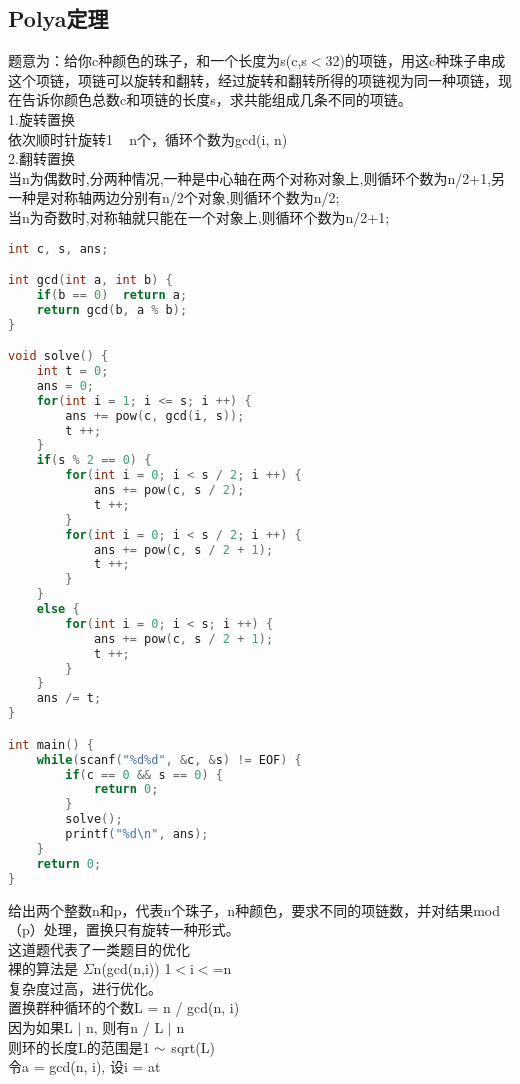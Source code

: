 \subsection{Polya定理}
题意为：给你c种颜色的珠子，和一个长度为s(c,s$<$32)的项链，用这c种珠子串成这个项链，项链可以旋转和翻转，经过旋转和翻转所得的项链视为同一种项链，现在告诉你颜色总数c和项链的长度s，求共能组成几条不同的项链。\\
1.旋转置换\\
    依次顺时针旋转1 ~ n个，循环个数为gcd(i, n)\\
2.翻转置换\\
    当n为偶数时,分两种情况,一种是中心轴在两个对称对象上,则循环个数为n/2+1,另一种是对称轴两边分别有n/2个对象,则循环个数为n/2;\\
    当n为奇数时,对称轴就只能在一个对象上,则循环个数为n/2+1;\\
    \begin{lstlisting}[language=c++]
int c, s, ans;

int gcd(int a, int b) {
    if(b == 0)  return a;
    return gcd(b, a % b);
}

void solve() {
    int t = 0;
    ans = 0;
    for(int i = 1; i <= s; i ++) {
        ans += pow(c, gcd(i, s));
        t ++;
    }
    if(s % 2 == 0) {
        for(int i = 0; i < s / 2; i ++) {
            ans += pow(c, s / 2);
            t ++;
        }
        for(int i = 0; i < s / 2; i ++) {
            ans += pow(c, s / 2 + 1);
            t ++;
        }
    }
    else {
        for(int i = 0; i < s; i ++) {
            ans += pow(c, s / 2 + 1);
            t ++;
        }
    }
    ans /= t;
}

int main() {
    while(scanf("%d%d", &c, &s) != EOF) {
        if(c == 0 && s == 0) {
            return 0;
        }
        solve();
        printf("%d\n", ans);
    }
    return 0;
}
    \end{lstlisting}
给出两个整数n和p，代表n个珠子，n种颜色，要求不同的项链数，并对结果mod（p）处理，置换只有旋转一种形式。\\
这道题代表了一类题目的优化\\
裸的算法是 $\Sigma$n(gcd(n,i)) 1$<$i$<$=n\\
复杂度过高，进行优化。\\
置换群种循环的个数L = n / gcd(n, i)\\
因为如果L $\mid$ n, 则有n / L $\mid$ n\\
则环的长度L的范围是1 $\scriptsize{\sim}$ sqrt(L)\\
令a = gcd(n, i), 设i = at\\
